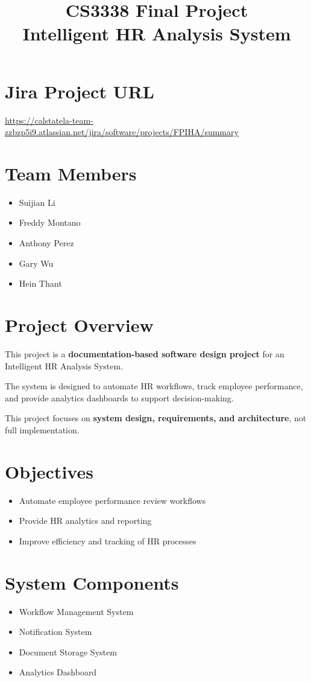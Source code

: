 \documentclass[12pt]{article}
\title{CS3338 Final Project\\
\large Intelligent HR Analysis System}
\date{}
\begin{document}
\maketitle

\section*{Jira Project URL}
\url{https://calstatela-team-zzbzp5i9.atlassian.net/jira/software/projects/FPIHA/summary}

\section*{Team Members}
\begin{itemize}
    \item Suijian Li
    \item Freddy Montano
    \item Anthony Perez
    \item Gary Wu
    \item Hein Thant
\end{itemize}

\section{Project Overview}
This project is a \textbf{documentation-based software design project} for an Intelligent HR Analysis System.

The system is designed to automate HR workflows, track employee performance, and provide analytics dashboards to support decision-making.

This project focuses on \textbf{system design, requirements, and architecture}, not full implementation.

\section{Objectives}
\begin{itemize}
    \item Automate employee performance review workflows
    \item Provide HR analytics and reporting
    \item Improve efficiency and tracking of HR processes
\end{itemize}

\section{System Components}
\begin{itemize}
    \item Workflow Management System
    \item Notification System
    \item Document Storage System
    \item Analytics Dashboard
\end{itemize}
\end{document}

